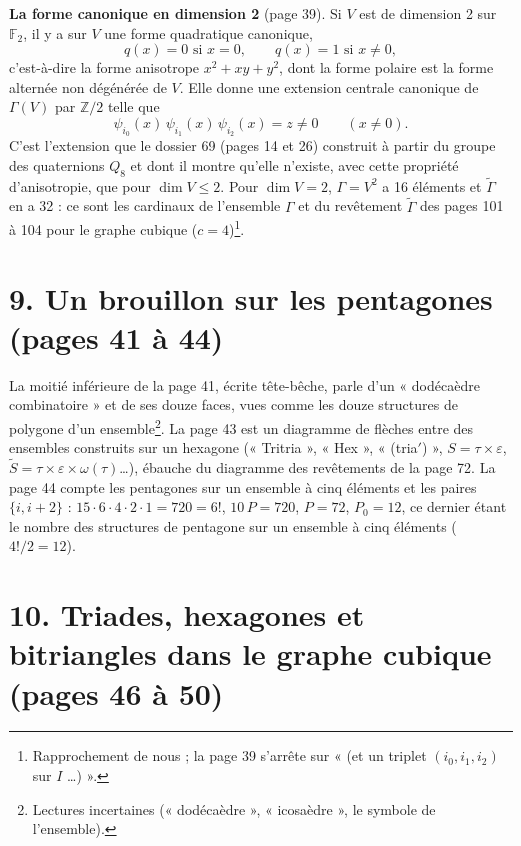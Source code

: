 \documentclass[11pt,a4paper]{article}
\begin{document}
\textbf{La forme canonique en dimension 2} (page 39). Si $V$ est de
dimension 2 sur $\mathbb{F}_2$, il y a sur $V$ une forme quadratique
canonique,
\[
q(x) = 0 \text{ si } x = 0, \qquad q(x) = 1 \text{ si } x \neq 0 ,
\]
c'est-à-dire la forme anisotrope $x^2 + xy + y^2$, dont la forme polaire est la
forme alternée non dégénérée de $V$. Elle donne une extension centrale
canonique de $\Gamma(V)$ par $\mathbb{Z}/2$ telle que
\[
\psi_{i_0}(x)\, \psi_{i_1}(x)\, \psi_{i_2}(x) = z \neq 0 \qquad (x \neq 0).
\]
C'est l'extension que le dossier 69 (pages 14 et 26) construit à partir du
groupe des quaternions $Q_8$ et dont il montre qu'elle n'existe, avec cette
propriété d'anisotropie, que pour $\dim V \leq 2$. Pour $\dim V = 2$, $\Gamma =
V^2$ a 16 éléments et $\widetilde\Gamma$ en a 32 : ce sont les cardinaux de
l'ensemble $\Gamma$ et du revêtement $\widetilde\Gamma$ des pages 101 à 104
pour le graphe cubique ($c = 4$)\footnote{Rapprochement de nous ; la page 39
s'arrête sur « (et un triplet $(i_0, i_1, i_2)$ sur $I$ \ldots) ».}.

\section*{9. Un brouillon sur les pentagones (pages 41 à 44)}

La moitié inférieure de la page 41, écrite tête-bêche, parle d'un
« dodécaèdre combinatoire » et de ses douze faces, vues comme les douze
structures de polygone d'un ensemble\footnote{Lectures incertaines
(« dodécaèdre », « icosaèdre », le symbole de l'ensemble).}. La page 43 est un
diagramme de flèches entre des ensembles construits sur un hexagone
(« Tritria », « Hex », « (tria$'$) », $S = \tau \times \varepsilon$,
$\widetilde S = \tau \times \varepsilon \times \omega(\tau)$\ldots), ébauche du
diagramme des revêtements de la page 72. La page 44 compte les pentagones sur
un ensemble à cinq éléments et les paires $\lbrace i, i+2\rbrace$ : $15 \cdot 6
\cdot 4 \cdot 2 \cdot 1 = 720 = 6!$, $10\,P = 720$, $P = 72$, $P_0 = 12$, ce
dernier étant le nombre des structures de pentagone sur un ensemble à cinq
éléments ($4!/2 = 12$).

\section*{10. Triades, hexagones et bitriangles dans le graphe cubique (pages 46 à 50)}
\end{document}
